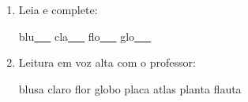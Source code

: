 \begin{exercicio}
\begin{enumerate}[resume]
\begin{enumerate}[label=(\alph*)]
    \item O som da unidade é: ( ) oral ( ) nasal 

    \item A primeira sílaba de BLUSA é: ( ) BLA ( ) BLO

    \item As palavras da unidade aparecem: ( ) no início ( ) no meio ( ) no fim das palavras

  \end{enumerate}

  \item Leia e complete:
  \begin{center}
  blu\underline{~~~} \quad cla\underline{~~~} \quad flo\underline{~~~} \quad glo\underline{~~~}
  \end{center}

  \item Leitura em voz alta com o professor:
  \begin{center}
  blusa \quad claro \quad flor \quad globo \quad placa \quad atlas \quad planta \quad flauta
  \end{center}

\end{enumerate}

\end{exercicio}



